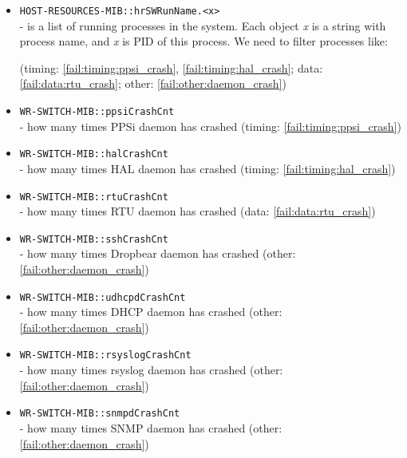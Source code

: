 \begin{itemize}[leftmargin=0pt]
	\item [] \texttt{HOST-RESOURCES-MIB::hrSWRunName.<x>}\\ - is a list of running
		processes in the system. Each object \emph{x} is a string with process name,
		and \emph{x} is PID of this process. We need to filter processes like:
		\vspace{12pt}
		(timing: \ref{fail:timing:ppsi_crash}, \ref{fail:timing:hal_crash}; data:
		\ref{fail:data:rtu_crash}; other: \ref{fail:other:daemon_crash})
	\item [] \texttt{WR-SWITCH-MIB::ppsiCrashCnt}\\ - how many times PPSi daemon
		has crashed (timing: \ref{fail:timing:ppsi_crash})
	\item [] \texttt{WR-SWITCH-MIB::halCrashCnt}\\ - how many times HAL daemon
		has crashed (timing: \ref{fail:timing:hal_crash})
	\item [] \texttt{WR-SWITCH-MIB::rtuCrashCnt}\\ - how many times RTU daemon
		has crashed (data: \ref{fail:data:rtu_crash})
	\item [] \texttt{WR-SWITCH-MIB::sshCrashCnt}\\ - how many times Dropbear
		daemon has crashed (other: \ref{fail:other:daemon_crash})
	\item [] \texttt{WR-SWITCH-MIB::udhcpdCrashCnt}\\ - how many times DHCP daemon
		has crashed (other: \ref{fail:other:daemon_crash})
	\item [] \texttt{WR-SWITCH-MIB::rsyslogCrashCnt}\\ - how many times rsyslog
		daemon has crashed (other: \ref{fail:other:daemon_crash})
	\item [] \texttt{WR-SWITCH-MIB::snmpdCrashCnt}\\ - how many times SNMP daemon
		has crashed (other: \ref{fail:other:daemon_crash})

\end{itemize}
